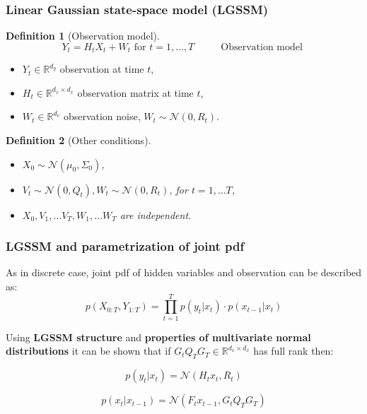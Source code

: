 \documentclass[xcolor=dvipsnames, compress]{beamer}
\newcommand{\R}{\ensuremath{\mathbb{R}}}
\newtheorem{defi}{Definition}[section]
\begin{document}
\begin{frame}
\frametitle{Linear Gaussian state-space model (LGSSM)}

\begin{defi}[Observation model]
	\begin{equation}
	Y_t = H_t X_{t} + W_t \mbox{ for } t=1, \ldots, T \hspace{1cm}  \mbox{ Observation model }
	\end{equation}
	
\end{defi}

\begin{itemize}
	\item $Y_t \in  \R^{d_y}$ observation at time $t$,
	\item $H_t \in  \R^{d_x \times d_x}$ observation matrix at time $t$,
	\item $W_t \in  \R^{d_v}$ observation noise, $W_t \sim \mathcal{N}(0,R_t)$.
\end{itemize}

\begin{defi}[Other conditions]
	\begin{itemize}
		\item $X_0\sim \mathcal{N}(\mu_0,\Sigma_0)$,
		\item $V_t \sim \mathcal{N}(0,Q_t), W_t \sim \mathcal{N}(0,R_t)$, for $t=1,\ldots T$,
		\item $X_0, V_1, \ldots V_T, W _1, \ldots W_T$  are independent.
	\end{itemize}
\end{defi}

\end{frame}

\begin{frame}
\frametitle{LGSSM and parametrization of joint pdf}

As in discrete case, joint pdf of hidden variables and observation can be described as:
\begin{equation}
p(X_{0:T}, Y_{1:T}) = \prod_{t=1}^T p(y_t|x_t) \cdot p(x_{t-1}|x_t)
\end{equation}

Using \textbf{LGSSM structure} and \textbf{properties of multivariate normal distributions} it can be shown that if $G_t Q_T G_T\in \R^{d_x \times d_x}$ has full rank then:

\begin{equation}
p(y_t|x_t) = \mathcal{N}(H_t x_{t}, R_t)
\end{equation}


\begin{equation}
p(x_t|x_{t-1}) = \mathcal{N}(F_t x_{t-1}, G_t Q_T G_T)
\end{equation}

\end{frame}
\end{document}
